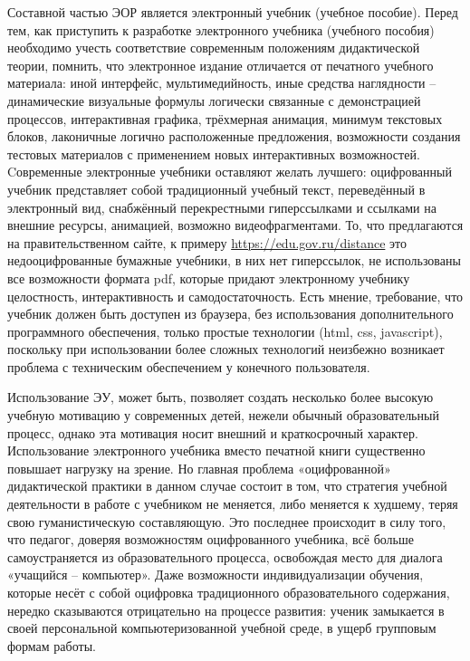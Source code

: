 Составной частью ЭОР является электронный учебник (учебное пособие). 
Перед тем, как приступить к разработке электронного учебника (учебного пособия) необходимо учесть соответствие современным положениям дидактической теории, помнить, что электронное издание отличается от печатного учебного материала: иной интерфейс, мультимедийность, иные средства наглядности – динамические визуальные формулы логически связанные с демонстрацией процессов, интерактивная графика, трёхмерная анимация, минимум текстовых блоков, лаконичные логично расположенные предложения, возможности создания тестовых материалов с применением новых интерактивных возможностей\cite{shevardina}.
Cовременные электронные учебники оставляют желать лучшего: оцифрованный учебник представляет собой традиционный учебный текст, переведённый в электронный вид, снабжённый перекрестными гиперссылками и ссылками на внешние ресурсы, анимацией, возможно видеофрагментами. То, что предлагаются на правительственном сайте, к примеру \url{https://edu.gov.ru/distance} это недооцифрованные бумажные учебники, в них нет гиперссылок, не использованы все возможности формата pdf, которые придают электронному учебнику целостность, интерактивность и самодостаточность. 
Есть мнение, требование, что учебник должен быть доступен из браузера, без использования дополнительного программного обеспечения, только простые технологии (html, css, javascript)\cite{hse_comunication}, поскольку при использовании более сложных технологий неизбежно возникает проблема с техническим обеспечением у конечного пользователя. 



Использование ЭУ, может быть, позволяет создать несколько более высокую учебную мотивацию у современных детей, нежели обычный образовательный процесс, однако эта мотивация носит внешний и краткосрочный характер.
Использование электронного учебника вместо печатной книги существенно повышает нагрузку на зрение. Но главная проблема «оцифрованной» дидактической практики в данном случае состоит в том, что стратегия учебной деятельности в работе с учебником не меняется, либо меняется к худшему, теряя свою гуманистическую составляющую. Это последнее происходит в
силу того, что педагог, доверяя возможностям оцифрованного учебника, всё больше самоустраняется из образовательного процесса, освобождая место для диалога «учащийся – компьютер».
Даже возможности индивидуализации обучения, которые несёт с собой оцифровка традиционного образовательного содержания, нередко сказываются отрицательно на процессе развития: ученик замыкается в своей персональной компьютеризованной учебной среде, в ущерб групповым формам работы.



